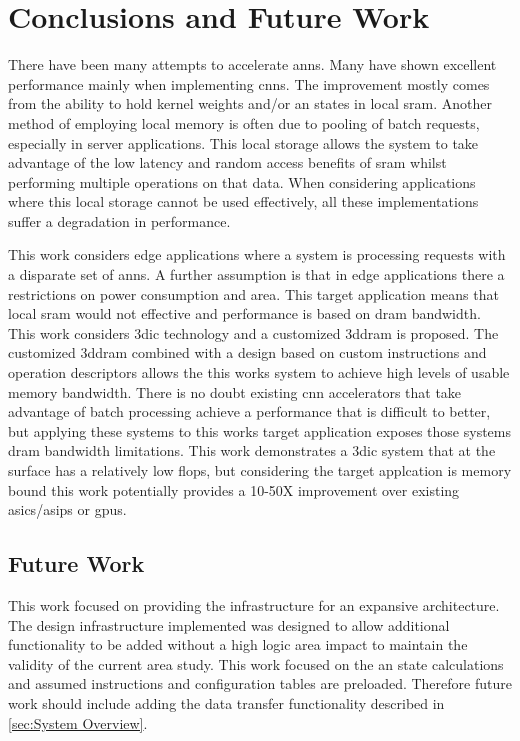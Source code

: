 
\chapter{Conclusions and Future Work}
\label{sec:Conclusions and Future Work}
\label{sec:chap-seven}

There have been many attempts to accelerate \acp{ann}. Many have shown excellent performance mainly when implementing \acp{cnn}. The improvement mostly comes from the ability to hold kernel weights and/or \ac{an} states in local \ac{sram}. 
Another method of employing local memory is often due to pooling of batch requests, especially in server applications.
This local storage allows the system to take advantage of the low latency and random access benefits of \ac{sram} whilst performing multiple operations on that data.
When considering applications where this local storage cannot be used effectively, all these implementations suffer a degradation in performance.

This work considers edge applications where a system is processing requests with a disparate set of \acp{ann}. 
A further assumption is that in edge applications there a restrictions on power consumption and area.
This target application means that local \ac{sram} would not effective and performance is based on \ac{dram} bandwidth.
This work considers \acf{3dic} technology and a customized \acf{3ddram} is proposed. 
The customized \ac{3ddram} combined with a design based on custom instructions and operation descriptors allows the this works system to achieve high levels of usable memory bandwidth.
There is no doubt existing \ac{cnn} accelerators that take advantage of batch processing achieve a performance that is difficult to better, but applying these systems to this works target application exposes those systems \ac{dram} bandwidth limitations.
This work demonstrates a \ac{3dic} system that at the surface has a relatively low \ac{flops}, but considering the target applcation is memory bound this work potentially provides a 10-50X improvement over existing \acp{asic}/\acp{asip} or \acp{gpu}.
\iffalse
given the target application, provides a potentially 10-50X performance improvement over existing ASIC/ASIPs or GPUs.
\fi

\section[Future Work]{Future Work}
\label{sec:Future Work}

This work focused on providing the infrastructure for an expansive architecture.
The design infrastructure implemented was designed to allow additional functionality to be added without a high logic area impact to maintain the validity of the current area study.
This work focused on the \ac{an} state calculations and assumed instructions and configuration tables are preloaded.
Therefore future work should include adding the data transfer functionality described in \ref{sec:System Overview}.

